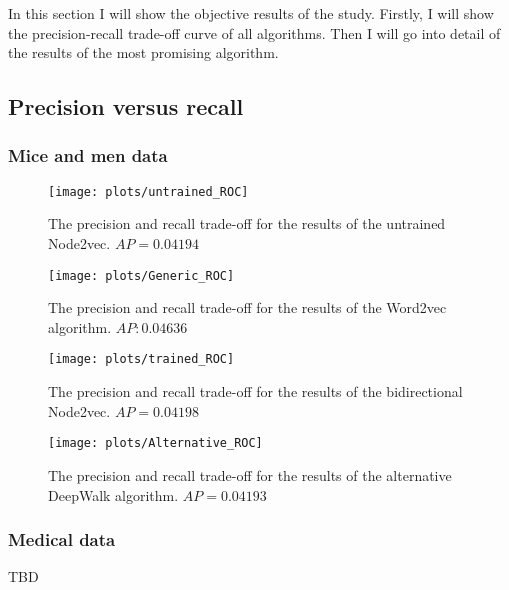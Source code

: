 \documentclass{article}
\begin{document}
 In this section I will show the objective results of the study. Firstly, I will show the precision-recall trade-off curve of all algorithms. Then I will go into detail of the results of the most promising algorithm.
 
 \subsection{Precision versus recall}
  \subsubsection{Mice and men data}
  \begin{figure}[H]
   \centering
   \texttt{[image: plots/untrained\_ROC]}
   \caption{The precision and recall trade-off for the results of the untrained Node2vec. $AP = 0.04194$}
   \label{ROC_untrained}
  \end{figure}
 
  \begin{figure}[H]
   \centering
   \texttt{[image: plots/Generic\_ROC]}
   \caption{The precision and recall trade-off for the results of the Word2vec algorithm. $AP: 0.04636$}
   \label{ROC_generic}
  \end{figure}
 
  \begin{figure}[H]
   \centering
   \texttt{[image: plots/trained\_ROC]}
   \caption{The precision and recall trade-off for the results of the bidirectional Node2vec. $AP = 0.04198$}
   \label{ROC_trained}
  \end{figure}
  
  \begin{figure}[H]
   \centering
   \texttt{[image: plots/Alternative\_ROC]}
   \caption{The precision and recall trade-off for the results of the alternative DeepWalk algorithm. $AP = 0.04193$}
   \label{ROC_alternative}
  \end{figure}
   \subsubsection{Medical data}
   TBD
  
\end{document}
